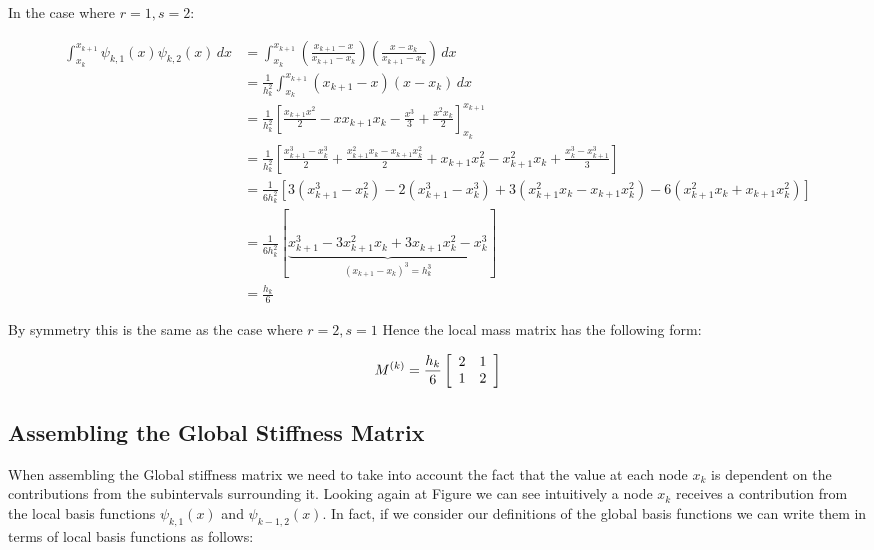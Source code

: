 In the case where $r = 1, s = 2$:

\begin{align*}
    \int_{x_k}^{x_{k+1}}\psi_{k,1}(x)\psi_{k,2}(x)\, dx &=
    \int_{x_k}^{x_{k+1}}\left(\frac{x_{k+1} - x}{x_{k+1} - x_k}\right)
                        \left(\frac{x - x_k}{x_{k+1} - x_k}\right)\, dx \\
    &= \frac{1}{h_k^2}\int_{x_k}^{x_{k+1}}(x_{k+1} - x)(x - x_k)\, dx \\
    &= \frac{1}{h_k^2}\left[\frac{x_{k+1}x^2}{2} - xx_{k+1}x_k
                            -\frac{x^3}{3} + \frac{x^2x_k}{2}\right]_{x_k}^{x_{k+1}} \\
    &= \frac{1}{h_k^2}\left[\frac{x_{k+1}^3 - x_k^3}{2} +
                            \frac{x_{k+1}^2x_k - x_{k+1}x_k^2}{2} +
                            x_{k+1}x_k^2 - x_{k+1}^2x_k +
                            \frac{x_k^3 - x_{k+1}^3}{3}\right] \\
    &= \frac{1}{6h_k^2}\left[3(x_{k+1}^3 - x_k^2) - 2(x_{k+1}^3 - x_k^3)
                           + 3(x_{k+1}^2x_k - x_{k+1}x_k^2) - 6(x_{k+1}^2x_k + x_{k+1}x_k^2)\right] \\
    &= \frac{1}{6h_k^2}
          [\underbrace{x_{k+1}^3 - 3x_{k+1}^2x_k + 3x_{k+1}x_k^2 - x_k^3}_{(x_{k+1} - x_k)^3 = h_k^3}] \\
    &= \frac{h_k}{6}
\end{align*}

By symmetry this is the same as the case where $r = 2, s = 1$ Hence the local
mass matrix has the following form:

\begin{equation}\label{eq:oned-deterministic-local-mass}
    M^{(k)} = \frac{h_k}{6}\left[\begin{array}{c c}
                2 & 1 \\ 1 & 2
              \end{array}\right]
\end{equation}

\subsection{Assembling the Global Stiffness Matrix}


When assembling the Global stiffness matrix we need to take into account the
fact that the value at each node $x_k$ is dependent on the contributions from
the subintervals surrounding it. Looking again at Figure
 we can see intuitively a node $x_k$ receives a
contribution from the local basis functions $\psi_{k,1}(x)$ and
$\psi_{{k-1},2}(x)$. In fact, if we consider our definitions of the global
basis functions  we can write them in terms of local
basis functions as follows:

